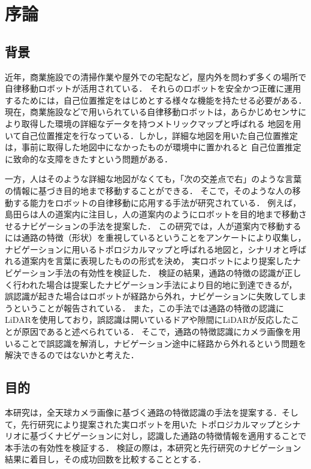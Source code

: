 \documentclass[../main]{subfiles}
\begin{document}
    \setcounter{secnumdepth}{2}
    \chapter{序論}
        \section{背景}
        近年，商業施設での清掃作業や屋外での宅配など，屋内外を問わず多くの場所で自律移動ロボットが活用されている．
        それらのロボットを安全かつ正確に運用するためには，自己位置推定をはじめとする様々な機能を持たせる必要がある．
        現在，商業施設などで用いられている自律移動ロボットは，あらかじめセンサにより取得した環境の詳細なデータを持つメトリックマップと呼ばれる
        地図を用いて自己位置推定を行なっている．しかし，詳細な地図を用いた自己位置推定は，事前に取得した地図中になかったものが環境中に置かれると
        自己位置推定に致命的な支障をきたすという問題がある．
        
        
        一方，人はそのような詳細な地図がなくても，「次の交差点で右」のような言葉の情報に基づき目的地まで移動することができる．
        そこで，そのような人の移動する能力をロボットの自律移動に応用する手法が研究されている．
        例えば，島田らは人の道案内に注目し，人の道案内のようにロボットを目的地まで移動させるナビゲーションの手法を提案した\cite{shimada_paper1}\cite{shimada_paper2}．
        この研究では，人が道案内で移動するには通路の特徴（形状）を重視しているということをアンケートにより収集し，
        ナビゲーションに用いるトポロジカルマップと呼ばれる地図と，シナリオと呼ばれる道案内を言葉に表現したものの形式を決め，
        実ロボットにより提案したナビゲーション手法の有効性を検証した．
        検証の結果，通路の特徴の認識が正しく行われた場合は提案したナビゲーション手法により目的地に到達できるが，
        誤認識が起きた場合はロボットが経路から外れ，ナビゲーションに失敗してしまうということが報告されている．
        また，この手法では通路の特徴の認識にLiDARを使用しており，誤認識は開いているドアや隙間にLiDARが反応したことが原因であると述べられている．
        そこで，通路の特徴認識にカメラ画像を用いることで誤認識を解消し，ナビゲーション途中に経路から外れるという問題を解決できるのではないかと考えた．

        \newpage

        \section{目的}
        本研究は，全天球カメラ画像に基づく通路の特徴認識の手法を提案する．そして，先行研究により提案された実ロボットを用いた
        トポロジカルマップとシナリオに基づくナビゲーションに対し，認識した通路の特徴情報を適用することで本手法の有効性を検証する．
        検証の際は，本研究と先行研究のナビゲーション結果に着目し，その成功回数を比較することとする．
\end{document}
